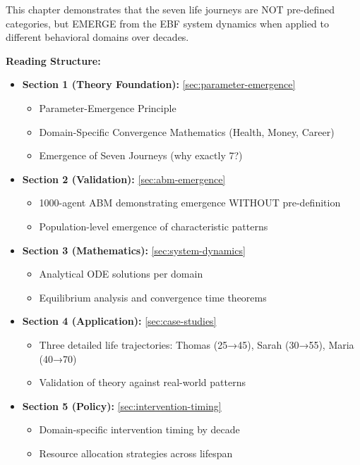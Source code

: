 \begin{tcolorbox}[colback=cyan!5!white, colframe=cyan!75!black, title=Chapter Overview: How This Chapter Is Organized]

This chapter demonstrates that the seven life journeys are NOT pre-defined categories, but EMERGE from the EBF system dynamics when applied to different behavioral domains over decades.

\textbf{Reading Structure:}

\begin{itemize}[nosep]
\item \textbf{Section 1 (Theory Foundation):} \ref{sec:parameter-emergence}
  \begin{itemize}[nosep]
    \item Parameter-Emergence Principle
    \item Domain-Specific Convergence Mathematics (Health, Money, Career)
    \item Emergence of Seven Journeys (why exactly 7?)
  \end{itemize}

\item \textbf{Section 2 (Validation):} \ref{sec:abm-emergence}
  \begin{itemize}[nosep]
    \item 1000-agent ABM demonstrating emergence WITHOUT pre-definition
    \item Population-level emergence of characteristic patterns
  \end{itemize}

\item \textbf{Section 3 (Mathematics):} \ref{sec:system-dynamics}
  \begin{itemize}[nosep]
    \item Analytical ODE solutions per domain
    \item Equilibrium analysis and convergence time theorems
  \end{itemize}

\item \textbf{Section 4 (Application):} \ref{sec:case-studies}
  \begin{itemize}[nosep]
    \item Three detailed life trajectories: Thomas (25→45), Sarah (30→55), Maria (40→70)
    \item Validation of theory against real-world patterns
  \end{itemize}

\item \textbf{Section 5 (Policy):} \ref{sec:intervention-timing}
  \begin{itemize}[nosep]
    \item Domain-specific intervention timing by decade
    \item Resource allocation strategies across lifespan
  \end{itemize}


\end{itemize}
\end{tcolorbox}
